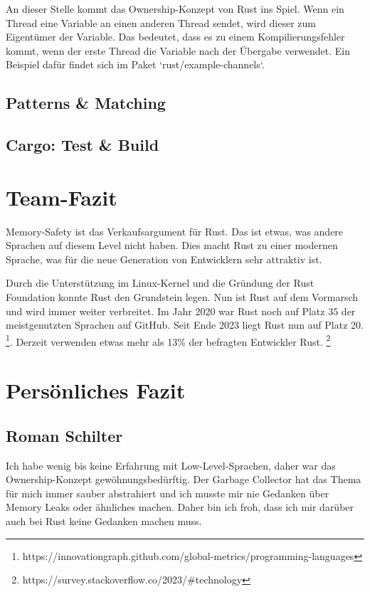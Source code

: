 \documentclass[letterpaper,12pt]{article}
\begin{document}
    An dieser Stelle kommt das Ownership-Konzept von Rust ins Spiel.
    Wenn ein Thread eine Variable an einen anderen Thread sendet, wird dieser zum Eigentümer der Variable.
    Das bedeutet, dass es zu einem Kompilierungsfehler kommt, wenn der erste Thread die Variable nach der Übergabe verwendet.
    Ein Beispiel dafür findet sich im Paket `rust/example-channels`.

    \subsection{Patterns \& Matching}\label{subsec:patterns-&-matching}

    \subsection{Cargo: Test \& Build}\label{subsec:cargo:-test-&-build}


    \section{Team-Fazit}\label{sec:team-fazit}
    Memory-Safety ist das Verkaufsargument für Rust.
    Das ist etwas, was andere Sprachen auf diesem Level nicht haben.
    Dies macht Rust zu einer modernen Sprache, was für die neue Generation von Entwicklern sehr attraktiv ist.

    Durch die Unterstützung im Linux-Kernel und die Gründung der Rust Foundation konnte Rust den Grundstein legen.
    Nun ist Rust auf dem Vormarsch und wird immer weiter verbreitet.
    Im Jahr 2020 war Rust noch auf Platz 35 der meistgenutzten Sprachen auf GitHub.
    Seit Ende 2023 liegt Rust nun auf Platz 20. \footnote{https://innovationgraph.github.com/global-metrics/programming-languages}.
    Derzeit verwenden etwas mehr als 13\% der befragten Entwickler Rust. \footnote{https://survey.stackoverflow.co/2023/\#technology}


    \section{Persönliches Fazit}\label{sec:personliches-fazit}

    \subsection{Roman Schilter}\label{subsec:roman}
    Ich habe wenig bis keine Erfahrung mit Low-Level-Sprachen, daher war das Ownership-Konzept gewöhnungsbedürftig.
    Der Garbage Collector hat das Thema für mich immer sauber abstrahiert und ich musste mir nie Gedanken über Memory Leaks oder ähnliches machen.
    Daher bin ich froh, dass ich mir darüber auch bei Rust keine Gedanken machen muss.
\end{document}
